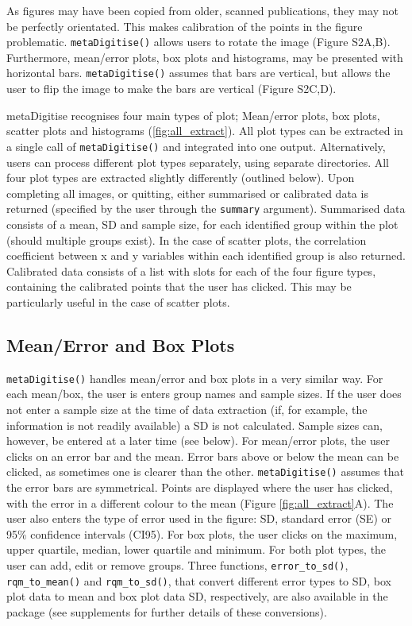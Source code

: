 \documentclass[12pt]{article}
\newcommand{\code}[1]{\texttt{#1}}
\newcommand{\fct}[1]{\texttt{#1()}}
\newcommand{\pkg}[1]{{\fontseries{b}\selectfont #1}}
\begin{document}
As figures may have been copied from older, scanned publications, they may not be perfectly orientated. This makes calibration of the points in the figure problematic. \fct{metaDigitise} allows users to rotate the image (Figure S2A,B). Furthermore, mean/error plots, box plots and histograms, may be presented with horizontal bars. \fct{metaDigitise} assumes that bars are vertical, but allows the user to flip the image to make the bars are vertical (Figure S2C,D).

\pkg{metaDigitise} recognises four main types of plot; Mean/error plots, box plots, scatter plots and histograms (\ref{fig:all_extract}). All plot types can be extracted in a single call of \fct{metaDigitise} and integrated into one output. Alternatively, users can process different plot types separately, using separate directories. All four plot types are extracted slightly differently (outlined below). Upon completing all images, or quitting, either summarised or calibrated data is returned (specified by the user through the \code{summary} argument). Summarised data consists of a mean, SD and sample size, for each identified group within the plot (should multiple groups exist). In the case of scatter plots, the correlation coefficient between x and y variables within each identified group is also returned. Calibrated data consists of a list with slots for each of the four figure types, containing the calibrated points that the user has clicked. This may be particularly useful in the case of scatter plots. 

\subsection{Mean/Error and Box Plots} 
\fct{metaDigitise} handles mean/error and box plots in a very similar way. For each mean/box, the user is enters group names and sample sizes. If the user does not enter a sample size at the time of data extraction (if, for example, the information is not readily available) a SD is not calculated. Sample sizes can, however, be entered at a later time (see below). For mean/error plots, the user clicks on an error bar and the mean. Error bars above or below the mean can be clicked, as sometimes one is clearer than the other. \fct{metaDigitise} assumes that the error bars are symmetrical. Points are displayed where the user has clicked, with the error in a different colour to the mean (Figure \ref{fig:all_extract}A). The user also enters the type of error used in the figure: SD, standard error (SE) or 95\% confidence intervals (CI95). For box plots, the user clicks on the maximum, upper quartile, median, lower quartile and minimum. For both plot types, the user can add, edit or remove groups. Three functions, \fct{error\_to\_sd}, \fct{rqm\_to\_mean} and \fct{rqm\_to\_sd}, that convert different error types to SD, box plot data to mean and box plot data SD, respectively, are also available in the package (see supplements for further details of these conversions).
\end{document}
